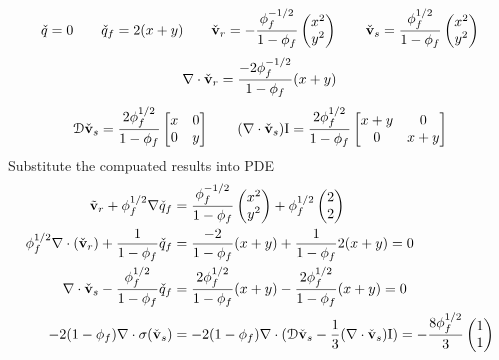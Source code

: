 \begin{equation}\label{eq:test1}
\check{q} = 0 \quad \quad \check{q}_f = 2(x+y) \quad \quad 
\check{\bold{v}}_r = -\frac{\phi_f^{-1/2}}{1-\phi_f}\begin{pmatrix}x^2 \\ y^2 \end{pmatrix} 
\quad \quad \check{\bold{v}}_s = \frac{\phi_f^{1/2}}{1-\phi_f} \begin{pmatrix}x^2 \\ y^2 \end{pmatrix}
\end{equation}
\begin{equation}
\nabla \cdot \check{\bold{v}}_r = \frac{-2\phi_f^{-1/2}}{1-\phi_f}(x+y) 
\end{equation}
\begin{equation}
\mathcal{D}\check{\bold{v}}_s = \frac{2\phi_f^{1/2}}{1-\phi_f}\begin{bmatrix} x & 0 \\ 0 & y \end{bmatrix}
\quad \quad 
(\nabla \cdot \check{\bold{v}}_s) \bold{\text{I}} = \frac{2\phi_f^{1/2}}{1-\phi_f} \begin{bmatrix} x+y & 0 \\ 0 & x+y \end{bmatrix}
\end{equation}
Substitute the compuated results into PDE
\begin{equation}
\begin{aligned}
\tilde{\bold{v}}_r + \phi_f^{1/2}\nabla\check{q}_f &= 
\frac{\phi_f^{-1/2}}{1-\phi_f}\begin{pmatrix}x^2 \\ y^2 \end{pmatrix} + \phi_f^{1/2}\begin{pmatrix} 2 \\ 2 \end{pmatrix}\\
\phi_f^{1/2}\nabla \cdot (\check{\bold{v}}_r) + \frac{1}{1-\phi_f}\check{q}_f  &= \frac{-2}{1-\phi_f}(x+y) + \frac{1}{1-\phi_f}2(x+y)=0\\
\nabla \cdot \check{\bold{v}}_s - \frac{\phi_f^{1/2}}{1-\phi_f}\check{q}_f &= \frac{2\phi_f^{1/2}}{1-\phi_f}(x+y) - \frac{2\phi_f^{1/2}}{1-\phi_f}(x+y) = 0\\
-2(1-\phi_f)\nabla \cdot \sigma(\check{\bold{v}}_s) &= -2(1-\phi_f)\nabla \cdot (\mathcal{D}\check{\bold{v}}_s - \frac{1}{3}(\nabla \cdot \check{\bold{v}}_s) \bold{\text{I}}) = 
-\frac{8\phi_f^{1/2}}{3} \begin{pmatrix} 1 \\ 1 \end{pmatrix}
\end{aligned}
\end{equation}
\fi

